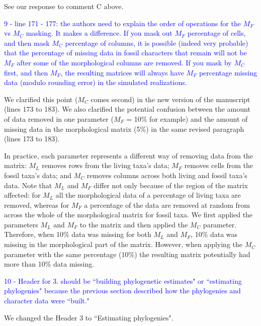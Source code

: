 \documentclass[11pt]{letter}
\begin{document}
\begin{letter}{}
See our response to comment C above.


\textcolor{blue}{9 - line 171 - 177: the authors need to explain the order of operations for the $M_F$ vs $M_C$ masking. It makes a difference. If you mask out $M_F$ percentage of cells, and then mask $M_C$ percentage of columns, it is possible (indeed very probable) that the percentage of missing data in fossil characters that remain will not be $M_F$ after some of the morphological columns are removed. If you mask by $M_C$ first, and then $M_F$, the resulting matrices will always have $M_F$ percentage missing data (modulo rounding error) in the simulated realizations.}

We clarified this point ($M_C$ comes second) in the new version of the manuscript (lines 173 to 183). We also clarified the potential confusion between the amount of data removed in one parameter ($M_F$ = 10\% for example) and the amount of missing data in the morphological matrix (5\%) in the same revised paragraph (lines 173 to 183).

\hfill\begin{minipage}{\dimexpr\textwidth-1cm}
In practice, each parameter represents a different way of removing data from the matrix: $M_L$ removes rows from the living taxa's data; $M_F$ removes cells from the fossil taxa's data; and $M_C$ removes columns across both living and fossil taxa's data. Note that $M_L$ and $M_F$ differ not only because of the region of the matrix affected: for $M_L$ all the morphological data of a percentage of living taxa are removed, whereas for $M_F$ a percentage of the data are removed at random from across the whole of the morphological matrix for fossil taxa. We first applied the parameters $M_L$ and $M_F$ to the matrix and then applied the $M_C$ parameter. Therefore, when 10\% data was missing for both $M_L$ and $M_F$, 10\% data was missing in the morphological part of the matrix. However, when applying the $M_C$ parameter with the same percentage (10\%) the resulting matrix potentially had more than 10\% data missing.
\end{minipage}


\textcolor{blue}{10 - Header for 3. should be ``building phylogenetic estimates" or ``estimating phylogenies" because the previous section described how the phylogenies and character data were ``built."}

We changed the Header 3 to ``Estimating phylogenies".


\end{letter}
\end{document}
